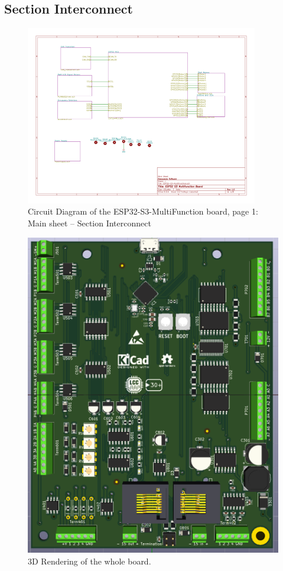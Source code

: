 \subsection{Section Interconnect}
\begin{figure}[hbpt]\begin{centering}%
\includegraphics[width=4in]{ESP32-S3-MultiFunction-1.pdf}
\caption{Circuit Diagram of the ESP32-S3-MultiFunction board, page 1: Main 
sheet -- Section Interconnect}
\end{centering}\end{figure}
\begin{figure}[hbpt]\begin{centering}%
\includegraphics{ESP32-S3-MultiFunction-top3D.png}
\caption{3D Rendering of the whole board.}
\end{centering}\end{figure}


